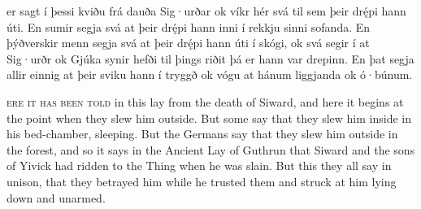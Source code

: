 \bpg\bpa%
%
 er sagt í þessi kviðu frá dauða Sig·urðar ok víkr hér svá til sem þeir drę́pi hann úti.  En sumir segja svá at þeir drę́pi hann inni í rekkju sinni sofanda.  En þýðverskir menn segja svá at þeir drę́pi hann úti í skógi, ok svá segir í  at Sig·urðr ok Gjúka synir hefði til þings riðit þá er hann var drepinn.  En þat segja allir einnig at þeir sviku hann í tryggð ok vógu at hánum liggjanda ok ó·búnum.\epa

\textsc{ere it has been told} in this lay from the death of Siward, and here it begins at the point when they slew him outside.  But some say that they slew him inside in his bed-chamber, sleeping.  But the Germans say that they slew him outside in the forest, and so it says in the Ancient Lay of Guthrun that Siward and the sons of Yivick had ridden to the Thing when he was slain.  But this they all say in unison, that they betrayed him while he trusted them and struck at him lying down and unarmed.\epb\epg

\sectionline
